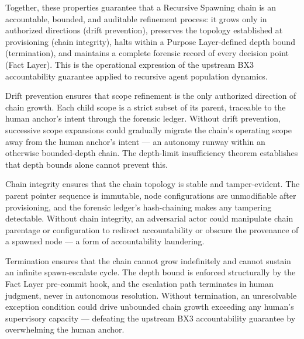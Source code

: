 Together, these properties guarantee that a Recursive Spawning chain is an accountable, bounded, and auditable refinement process: it grows only in authorized directions (drift prevention), preserves the topology established at provisioning (chain integrity), halts within a Purpose Layer-defined depth bound (termination), and maintains a complete forensic record of every decision point (Fact Layer). This is the operational expression of the upstream BX3 accountability guarantee applied to recursive agent population dynamics.

Drift prevention ensures that scope refinement is the only authorized direction of chain growth. Each child scope is a strict subset of its parent, traceable to the human anchor's intent through the forensic ledger. Without drift prevention, successive scope expansions could gradually migrate the chain's operating scope away from the human anchor's intent — an autonomy runway within an otherwise bounded-depth chain. The depth-limit insufficiency theorem establishes that depth bounds alone cannot prevent this.

Chain integrity ensures that the chain topology is stable and tamper-evident. The parent pointer sequence is immutable, node configurations are unmodifiable after provisioning, and the forensic ledger's hash-chaining makes any tampering detectable. Without chain integrity, an adversarial actor could manipulate chain parentage or configuration to redirect accountability or obscure the provenance of a spawned node — a form of accountability laundering.

Termination ensures that the chain cannot grow indefinitely and cannot sustain an infinite spawn-escalate cycle. The depth bound is enforced structurally by the Fact Layer pre-commit hook, and the escalation path terminates in human judgment, never in autonomous resolution. Without termination, an unresolvable exception condition could drive unbounded chain growth exceeding any human's supervisory capacity — defeating the upstream BX3 accountability guarantee by overwhelming the human anchor.

